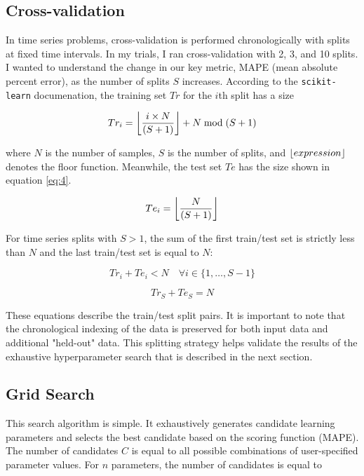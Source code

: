 \documentclass[11pt, oneside, authoryear]{report}
\DeclarePairedDelimiter{\floor}{\lfloor}{\rfloor}
\begin{document}
\subsection{Cross-validation}
\label{cross_validation}
In time series problems, cross-validation is performed chronologically with splits at fixed time intervals. In my trials, I ran cross-validation with 2, 3, and 10 splits. I wanted to understand the change in our key metric, MAPE (mean absolute percent error), as the number of splits $S$ increases. According to the \texttt{scikit-learn} documenation, the training set $Tr$ for the $i$th split has a size

\begin{equation}
  \label{eq:3}
  Tr_{i} = \floor*{\frac{i \times N}{(S + 1)}} + N \bmod (S + 1)
\end{equation}

where $N$ is the number of samples, $S$ is the number of splits, and $\floor{expression}$ denotes the floor function. Meanwhile, the test set $Te$ has the size shown in equation \ref{eq:4}.

\begin{equation}
  \label{eq:4}
  Te_{i} = \floor*{\frac{N}{(S + 1)}}
\end{equation}

For time series splits with $S>1$, the sum of the first train/test set is strictly less than $N$ and the last train/test set is equal to $N$:

\begin{equation}
  \label{eq:5}
  Tr_{i} + Te_{i} < N \quad \forall i \in \{1, \dots, S-1\}
\end{equation}

\begin{equation}
  \label{eq:6}
  Tr_{S} + Te_{S} = N
\end{equation}

These equations describe the train/test split pairs. It is important to note that the chronological indexing of the data is preserved for both input data and additional "held-out" data. This splitting strategy helps validate the results of the exhaustive hyperparameter search that is described in the next section.
\subsection{Grid Search}
This search algorithm is simple. It exhaustively generates candidate learning parameters and selects the best candidate based on the scoring function (MAPE). The number of candidates $C$ is equal to all possible combinations of user-specified parameter values. For $n$ parameters, the number of candidates is equal to
\end{document}

